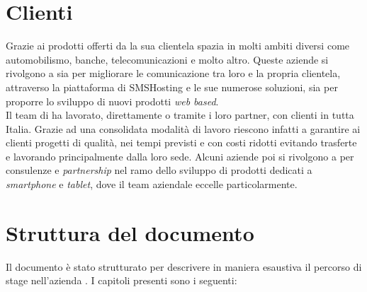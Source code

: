 \section{Clienti}
Grazie ai prodotti offerti da \azienda{} la sua clientela spazia in molti ambiti diversi come automobilismo, banche, telecomunicazioni e molto altro. Queste aziende si rivolgono a \azienda{} sia per migliorare le comunicazione tra loro e la propria clientela, attraverso la piattaforma di SMSHosting e le sue numerose soluzioni, sia per proporre lo sviluppo di nuovi prodotti \emph{web based}. \\
Il team di \azienda{} ha lavorato, direttamente o tramite i loro partner, con clienti in tutta Italia. 
Grazie ad una consolidata modalità di lavoro riescono infatti a garantire ai clienti progetti di qualità, nei tempi previsti e con costi ridotti evitando trasferte e lavorando principalmente dalla loro sede. 
Alcuni aziende poi si rivolgono a \azienda per consulenze e \emph{partnership} nel ramo dello sviluppo di prodotti dedicati a \emph{smartphone} e \emph{tablet}, dove il team aziendale eccelle particolarmente.

\section{Struttura del documento}
Il documento è stato strutturato per descrivere in maniera esaustiva il percorso di stage nell'azienda \azienda{}. I capitoli presenti sono i seguenti:

